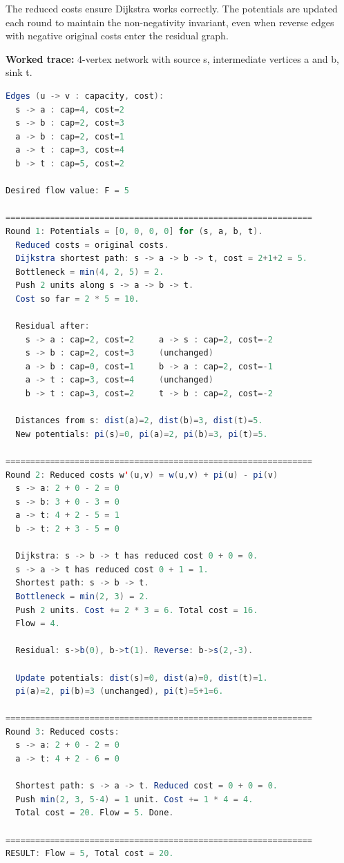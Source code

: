The reduced costs ensure Dijkstra works correctly. The potentials are updated each round to maintain the non-negativity invariant, even when reverse edges with negative original costs enter the residual graph.

\textbf{Worked trace:} 4-vertex network with source s, intermediate vertices a and b, sink t.

\begin{lstlisting}[language=Java]
Edges (u -> v : capacity, cost):
  s -> a : cap=4, cost=2
  s -> b : cap=2, cost=3
  a -> b : cap=2, cost=1
  a -> t : cap=3, cost=4
  b -> t : cap=5, cost=2

Desired flow value: F = 5

==============================================================
Round 1: Potentials = [0, 0, 0, 0] for (s, a, b, t).
  Reduced costs = original costs.
  Dijkstra shortest path: s -> a -> b -> t, cost = 2+1+2 = 5.
  Bottleneck = min(4, 2, 5) = 2.
  Push 2 units along s -> a -> b -> t.
  Cost so far = 2 * 5 = 10.

  Residual after:
    s -> a : cap=2, cost=2     a -> s : cap=2, cost=-2
    s -> b : cap=2, cost=3     (unchanged)
    a -> b : cap=0, cost=1     b -> a : cap=2, cost=-1
    a -> t : cap=3, cost=4     (unchanged)
    b -> t : cap=3, cost=2     t -> b : cap=2, cost=-2

  Distances from s: dist(a)=2, dist(b)=3, dist(t)=5.
  New potentials: pi(s)=0, pi(a)=2, pi(b)=3, pi(t)=5.

==============================================================
Round 2: Reduced costs w'(u,v) = w(u,v) + pi(u) - pi(v)
  s -> a: 2 + 0 - 2 = 0
  s -> b: 3 + 0 - 3 = 0
  a -> t: 4 + 2 - 5 = 1
  b -> t: 2 + 3 - 5 = 0

  Dijkstra: s -> b -> t has reduced cost 0 + 0 = 0.
  s -> a -> t has reduced cost 0 + 1 = 1.
  Shortest path: s -> b -> t.
  Bottleneck = min(2, 3) = 2.
  Push 2 units. Cost += 2 * 3 = 6. Total cost = 16.
  Flow = 4.

  Residual: s->b(0), b->t(1). Reverse: b->s(2,-3).

  Update potentials: dist(s)=0, dist(a)=0, dist(t)=1.
  pi(a)=2, pi(b)=3 (unchanged), pi(t)=5+1=6.

==============================================================
Round 3: Reduced costs:
  s -> a: 2 + 0 - 2 = 0
  a -> t: 4 + 2 - 6 = 0

  Shortest path: s -> a -> t. Reduced cost = 0 + 0 = 0.
  Push min(2, 3, 5-4) = 1 unit. Cost += 1 * 4 = 4.
  Total cost = 20. Flow = 5. Done.

==============================================================
RESULT: Flow = 5, Total cost = 20.
\end{lstlisting}

